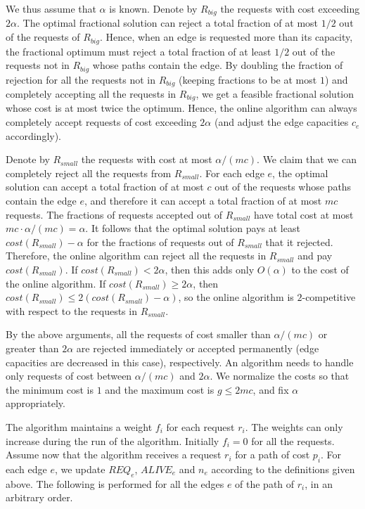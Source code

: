 \documentclass{sig-alternate}
\begin{document}
We thus assume that $\alpha$ is known. Denote by $R_{big}$ the
requests with cost exceeding $2 \alpha$. The optimal fractional
solution can reject a total fraction of at most $1/2$ out of the
requests of $R_{big}$. Hence, when an edge is requested more than
its capacity, the fractional optimum must reject a total fraction
of at least $1/2$ out of the requests not in $R_{big}$ whose paths
contain the edge. By doubling the fraction of rejection for all
the requests not in $R_{big}$ (keeping fractions to be at most
$1$) and completely accepting all the requests in $R_{big}$, we
get a feasible fractional solution whose cost is at most twice the
optimum. Hence, the online algorithm can always completely accept
requests of cost exceeding $2 \alpha$ (and adjust the edge
capacities $c_e$ accordingly).

Denote by $R_{small}$ the requests with cost at most
$\alpha/(mc)$. We claim that we can completely reject all the
requests from $R_{small}$. For each edge $e$, the optimal solution
can accept a total fraction of at most $c$ out of the requests
whose paths contain the edge $e$, and therefore it can accept a
total fraction of at most $mc$ requests. The fractions of requests
accepted out of $R_{small}$ have total cost at most $mc \cdot
\alpha/(mc) = \alpha$. It follows that the optimal solution pays
at least $cost(R_{small})-\alpha$ for the fractions of requests
out of $R_{small}$ that it rejected. Therefore, the online
algorithm can reject all the requests in $R_{small}$ and pay
$cost(R_{small})$. If $cost(R_{small}) < 2\alpha$, then this adds
only $O(\alpha)$ to the cost of the online algorithm. If
$cost(R_{small}) \geq 2\alpha$, then $cost(R_{small}) \leq
2(cost(R_{small})-\alpha)$, so the online algorithm is
$2$-competitive with respect to the requests in $R_{small}$.

By the above arguments, all the requests of cost smaller than
$\alpha/(mc)$ or greater than $2 \alpha$ are rejected immediately
or accepted permanently (edge capacities are decreased in this
case), respectively. An algorithm needs to handle only requests
of cost between $\alpha/(mc)$ and $2 \alpha$. We normalize the
costs so that the minimum cost is $1$ and the maximum cost is $g
\leq 2mc$, and fix $\alpha$ appropriately.

The algorithm maintains a weight $f_i$ for each request $r_i$. The
weights can only increase during the run of the algorithm.
Initially $f_i=0$ for all the requests. Assume now that the
algorithm receives a request $r_i$ for a path of cost $p_i$. For
each edge $e$, we update $REQ_e$, $ALIVE_e$ and $n_e$ according to
the definitions given above. The following is performed for all
the edges $e$ of the path of $r_i$, in an arbitrary order.
\end{document}
